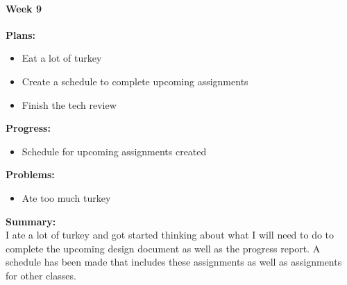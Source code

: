 \paragraph{Week 9}
\begin{adjustwidth}{2.5em}{0pt}
    \vspace{-0.5cm}\textbf{Plans:}
    \vspace{-0.5cm}
    \begin{itemize}
        \item Eat a lot of turkey
        \item Create a schedule to complete upcoming assignments
        \item Finish the tech review  

    \end{itemize} 
    \vspace{-0.3cm}\textbf{Progress:}
    \vspace{-0.5cm}
    \begin{itemize}
        \item Schedule for upcoming assignments created
    \end{itemize} 
    \vspace{-0.3cm}\textbf{Problems:}
    \vspace{-0.5cm}
    \begin{itemize}
        \item Ate too much turkey

    \end{itemize}  
    \vspace{-0.3cm}\noindent\textbf{Summary:}\\
    \noindent I ate a lot of turkey and got started thinking about what I will need to do to complete the upcoming design document as well as the progress report. A schedule has been made that includes these assignments as well as assignments for other classes.
	\end{adjustwidth} 
